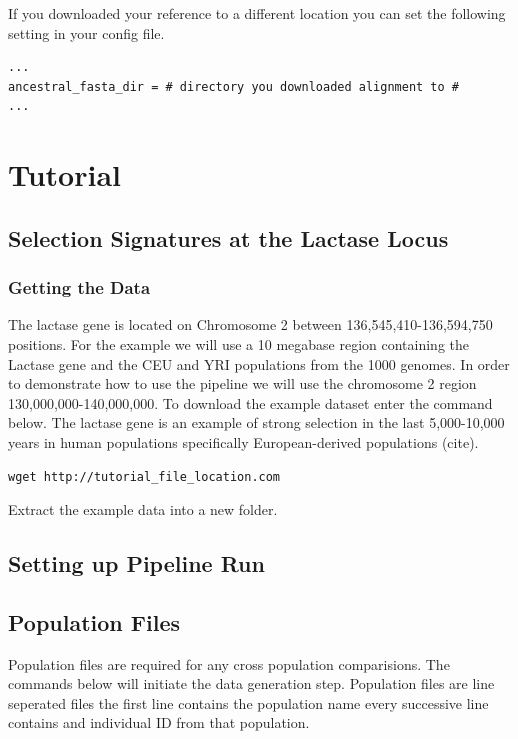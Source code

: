 \documentclass[a4paper,10pt]{article}
\begin{document}
If you downloaded your reference to a different location you can set the following setting in your config file.\\
\begin{verbatim}
...
ancestral_fasta_dir = # directory you downloaded alignment to #
...
\end{verbatim}

\section{Tutorial}
\subsection{Selection Signatures at the Lactase Locus}
\subsubsection{Getting the Data}
The lactase gene is located on Chromosome 2 between 136,545,410-136,594,750 positions. For the example we will use a 10 megabase region containing the Lactase gene and the CEU and YRI populations from the 1000 genomes. In order to demonstrate how to use the pipeline we will use the chromosome 2 region 130,000,000-140,000,000. To download the example dataset enter the command below. The lactase gene is an example of strong selection in the last 5,000-10,000 years in human populations specifically European-derived populations (cite).  \\

\begin{verbatim}
wget http://tutorial_file_location.com 
\end{verbatim}

Extract the example data into a new folder.

\subsection{Setting up Pipeline Run}
\subsection{Population Files}
Population files are required for any cross population comparisions. The commands below will initiate the data generation step. Population files are line seperated files the first line contains the population name every successive line contains and individual ID from that population.\\
\end{document}
